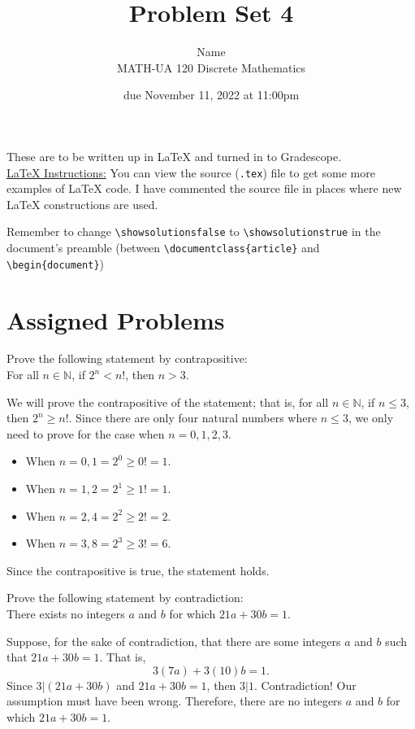 \documentclass{article}
\title{Problem Set 4}
\author{%
    Name
\\  MATH-UA 120 Discrete Mathematics
}
\date{due November 11, 2022 at 11:00pm}
\newif\ifshowsolutions
\newcommand{\danger}{\marginpar[\hfill\dbend]{\dbend\hfill}}
\theoremstyle{definition}
\begin{document}
\maketitle



These are to be written up in \LaTeX{} and turned in to Gradescope.\\



\ifshowsolutions
    \SetupExSheets{solution/print=true}
\else
    \danger
 \underline{ \LaTeX{}  Instructions:}  You can view the source (\texttt{.tex}) file to get some more examples of \LaTeX{} code.  I have commented the source file in places where new \LaTeX{} constructions are used.
  
  Remember to change \verb|\showsolutionsfalse| to \verb|\showsolutionstrue|
    in the document's preamble 
    (between \verb|\documentclass{article}| and \verb|\begin{document}|)
\fi

\section*{Assigned Problems}

\begin{question}
    Prove the following statement by contrapositive: \\
    For all $n\in \mathbb{N}$, if $2^n<n!$, then $n>3$.
\end{question}
\begin{solution}
We will prove the contrapositive of the statement; that is, for all $n\in \mathbb{N}$, if $n\leq 3$, then $2^n\geq n!$. Since there are only four natural numbers where $n\leq 3$, we only need to prove for the case when $n=0, 1, 2, 3$.
\begin{itemize}
\item When $n=0, 1 = 2^0 \geq 0!=1.$
\item When $n=1, 2 = 2^1 \geq 1!=1.$
\item When $n=2, 4 = 2^2 \geq 2!=2.$
\item When $n=3, 8 = 2^3 \geq 3!=6.$
\end{itemize}
Since the contrapositive is true, the statement holds.
\end{solution}


\begin{question}
    Prove the following statement by contradiction:\\
    There exists no integers $a$ and $b$ for which $21a + 30b = 1$.
\end{question}
\begin{solution}
Suppose, for the sake of contradiction, that there are some integers $a$ and $b$ such that $21a + 30b = 1$. That is,
	\[ 3(7a) + 3(10)b = 1. \]
Since $3|(21a+30b)$ and $21a + 30b = 1$, then $3|1$. Contradiction! Our assumption must have been wrong. Therefore, there are no integers $a$ and $b$ for which $21a + 30b = 1$.
\end{solution}
\end{document}
